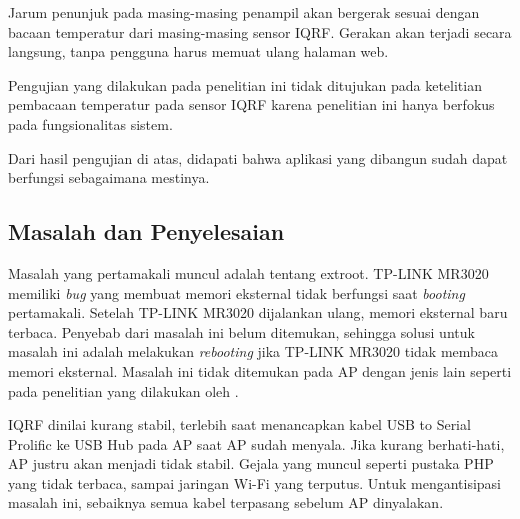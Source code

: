 			Jarum penunjuk pada masing-masing penampil akan bergerak sesuai dengan bacaan temperatur dari masing-masing sensor IQRF. Gerakan akan terjadi secara langsung, tanpa pengguna harus memuat ulang halaman web.

			Pengujian yang dilakukan pada penelitian ini tidak ditujukan pada ketelitian pembacaan temperatur pada sensor IQRF karena penelitian ini hanya berfokus pada fungsionalitas sistem.
			
			Dari hasil pengujian di atas, didapati bahwa aplikasi yang dibangun sudah dapat berfungsi sebagaimana mestinya.

		\subsection{Masalah dan Penyelesaian}
			Masalah yang pertamakali muncul adalah tentang extroot. TP-LINK MR3020 memiliki \emph{bug} yang membuat memori eksternal tidak berfungsi saat \emph{booting} pertamakali. Setelah TP-LINK MR3020 dijalankan ulang, memori eksternal baru terbaca. Penyebab dari masalah ini belum ditemukan, sehingga solusi untuk masalah ini adalah melakukan \emph{rebooting} jika TP-LINK MR3020 tidak membaca memori eksternal. Masalah ini tidak ditemukan pada AP dengan jenis lain seperti pada penelitian yang dilakukan oleh \cite{wibowo2013wireless}.

			
			IQRF dinilai kurang stabil, terlebih saat menancapkan kabel USB to Serial Prolific ke USB Hub pada AP saat AP sudah menyala. Jika kurang berhati-hati, AP justru akan menjadi tidak stabil. Gejala yang muncul seperti pustaka PHP yang tidak terbaca, sampai jaringan Wi-Fi yang terputus. Untuk mengantisipasi masalah ini, sebaiknya semua kabel terpasang sebelum AP dinyalakan.
			

